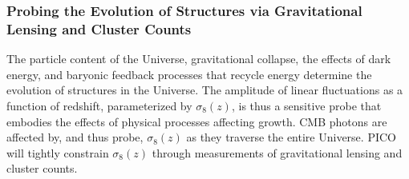 \documentclass[PICOReport.tex]{subfiles}
\begin{document}
\subsubsection{Probing the Evolution of Structures via Gravitational Lensing and Cluster Counts} 
\label{sec:gravitationallensing}

The particle content of the Universe, gravitational collapse, the effects of dark energy, and baryonic feedback processes that recycle energy determine the evolution of structures in the Universe. The amplitude of linear fluctuations as a function of redshift, parameterized by $\sigma_8(z)$, is thus a sensitive probe that embodies the effects of physical processes affecting growth. \ac{CMB} photons are affected by, and thus probe, $\sigma_{8}(z)$ as they traverse the entire Universe. PICO will tightly constrain $\sigma_8(z)$ through measurements of gravitational lensing and cluster counts. 
\end{document}
